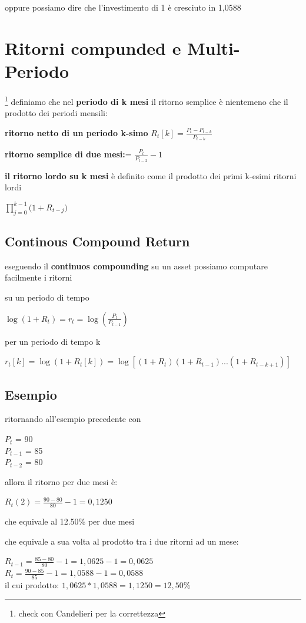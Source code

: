 \documentclass[a4paper,11pt]{report}
\begin{document}
{	oppure possiamo dire che l'investimento di 1 è cresciuto in 1,0588
\section{Ritorni compunded e Multi-Periodo} \footnote{check con Candelieri per la correttezza}
	definiamo che nel \textbf{periodo di k mesi} il ritorno semplice è nientemeno che il prodotto dei periodi mensili:

	\textbf{ritorno netto di un periodo k-simo}	$R_t[k]= {\frac{P_t-P_{t-k}}{P_{t-k}}} $

	\textbf{ritorno semplice di due mesi:}= ${\frac {P_t}{P_{t-2}}} - 1 $

	\textbf{il ritorno lordo su k mesi } è definito come il prodotto dei primi k-esimi ritorni lordi
\begin{center}
	${\prod\limits_{j=0}^{k-1}({1+R_{t-j}}})$
\end{center}
\subsection{Continous Compound Return}
	eseguendo  il \textbf{continuos compounding} su un asset possiamo computare facilmente i ritorni

	su un periodo di tempo
\begin{center}
	$\log{(1+R_t)} = r_t =\log{({\frac {P_t}{P_{t-1}}})}$
\end{center}
	per un periodo di tempo k
\begin{center}
	$r_t[k]= \log{(1+R_t[k])} =\log{[(1+R_t)(1+R_{t-1})  ...(1+R_{t-k+1})]}$
\end{center}
\subsection{Esempio}
	ritornando all'esempio precedente con
	\begin{center}
	$P_t$ = 90  \\
	$P_{t-1}$ = 85 \\
	$P_{t-2}$ = 80 \\
	\end{center}
	allora il ritorno per due mesi è:
	\begin{center}
	$R_t(2) = {\frac {90-80}{80}} - 1 = 0,1250 $
	\end{center}
	che equivale al 12.50\% per due mesi

	che equivale a sua volta al prodotto tra i due ritorni ad un mese:
	\begin{center}
	$R_{t-1}= {\frac {85-80}{80}} - 1 =1,0625-1= 0,0625 $\\
	$R_t = {\frac {90-85}{85}} - 1 =1,0588-1= 0,0588 $ \\
	 il cui prodotto:  $1,0625*1,0588=1,1250 = 12,50\% $ 
	\end{center}
}
\end{document}
